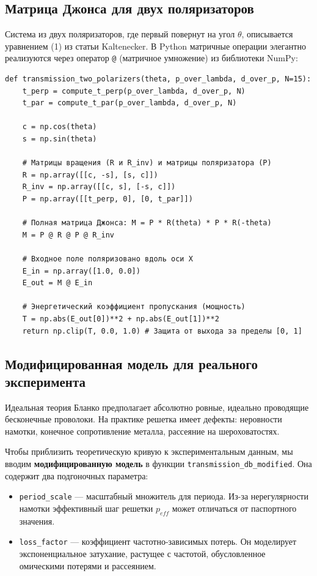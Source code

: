 \subsection{Матрица Джонса для двух поляризаторов}

Система из двух поляризаторов, где первый повернут на угол $\theta$, описывается уравнением (1) из статьи Kaltenecker. В Python матричные операции элегантно реализуются через оператор \texttt{@} (матричное умножение) из библиотеки NumPy:

\begin{verbatim}
def transmission_two_polarizers(theta, p_over_lambda, d_over_p, N=15):
    t_perp = compute_t_perp(p_over_lambda, d_over_p, N)
    t_par = compute_t_par(p_over_lambda, d_over_p, N)

    c = np.cos(theta)
    s = np.sin(theta)

    # Матрицы вращения (R и R_inv) и матрицы поляризатора (P)
    R = np.array([[c, -s], [s, c]])
    R_inv = np.array([[c, s], [-s, c]])
    P = np.array([[t_perp, 0], [0, t_par]])

    # Полная матрица Джонса: M = P * R(theta) * P * R(-theta)
    M = P @ R @ P @ R_inv

    # Входное поле поляризовано вдоль оси X
    E_in = np.array([1.0, 0.0])
    E_out = M @ E_in

    # Энергетический коэффициент пропускания (мощность)
    T = np.abs(E_out[0])**2 + np.abs(E_out[1])**2
    return np.clip(T, 0.0, 1.0) # Защита от выхода за пределы [0, 1]
\end{verbatim}

\subsection{Модифицированная модель для реального эксперимента}

Идеальная теория Бланко предполагает абсолютно ровные, идеально проводящие бесконечные проволоки. На практике решетка имеет дефекты: неровности намотки, конечное сопротивление металла, рассеяние на шероховатостях.

Чтобы приблизить теоретическую кривую к экспериментальным данным, мы вводим \textbf{модифицированную модель} в функции \texttt{transmission\_db\_modified}. Она содержит два подгоночных параметра:
\begin{itemize}
    \item \texttt{period\_scale} — масштабный множитель для периода. Из-за нерегулярности намотки эффективный шаг решетки $p_{eff}$ может отличаться от паспортного значения.
    \item \texttt{loss\_factor} — коэффициент частотно-зависимых потерь. Он моделирует экспоненциальное затухание, растущее с частотой, обусловленное омическими потерями и рассеянием.
\end{itemize}

